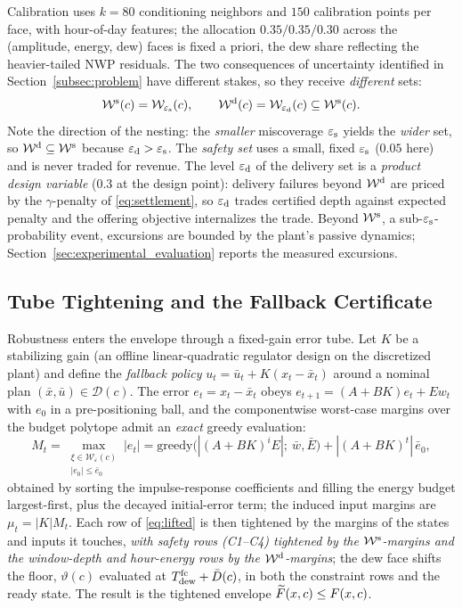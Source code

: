 Calibration uses $k=80$ conditioning neighbors and $150$ calibration points
per face, with hour-of-day features; the allocation $0.35/0.35/0.30$ across
the (amplitude, energy, dew) faces is fixed a priori, the dew share
reflecting the heavier-tailed NWP residuals. The two consequences of
uncertainty identified in Section~\ref{subsec:problem} have different
stakes, so they receive \emph{different} sets:
\begin{equation}
\mathcal{W}^{\mathrm{s}}(c)=\mathcal{W}_{\varepsilon_{\mathrm{s}}}(c),\qquad
\mathcal{W}^{\mathrm{d}}(c)=\mathcal{W}_{\varepsilon_{\mathrm{d}}}(c)\subseteq\mathcal{W}^{\mathrm{s}}(c).
\label{eq:nested}
\end{equation}
Note the direction of the nesting: the \emph{smaller} miscoverage $\varepsilon_{\mathrm{s}}$
yields the \emph{wider} set, so $\mathcal{W}^{\mathrm{d}}\subseteq\mathcal{W}^{\mathrm{s}}$ because
$\varepsilon_{\mathrm{d}}>\varepsilon_{\mathrm{s}}$. The \emph{safety set} uses a small, fixed $\varepsilon_{\mathrm{s}}$ ($0.05$
here) and is never traded for revenue. The level $\varepsilon_{\mathrm{d}}$ of the delivery set is a \emph{product
design variable} ($0.3$ at the design point): delivery failures beyond
$\mathcal{W}^{\mathrm{d}}$ are priced by the $\gamma$-penalty of \eqref{eq:settlement}, so
$\varepsilon_{\mathrm{d}}$ trades certified depth against expected penalty and the offering
objective internalizes the trade. Beyond $\mathcal{W}^{\mathrm{s}}$, a sub-$\varepsilon_{\mathrm{s}}$-probability
event, excursions are bounded by the plant's passive dynamics;
Section~\ref{sec:experimental_evaluation} reports the measured excursions.

\subsection{Tube Tightening and the Fallback Certificate}
\label{subsec:tube}

Robustness enters the envelope through a fixed-gain error tube. Let $K$ be a
stabilizing gain (an offline linear-quadratic regulator design on the
discretized plant) and define
the \emph{fallback policy} $u_t=\bar u_t + K(x_t-\bar x_t)$ around a nominal
plan $(\bar x,\bar u)\in\mathcal{D}(c)$. The error $e_t=x_t-\bar x_t$ obeys
$e_{t+1}=(A+BK)e_t+Ew_t$ with $e_0$ in a pre-positioning ball, and the
componentwise worst-case margins over the budget polytope admit an
\emph{exact} greedy evaluation:
\begin{equation}
M_t=\!\!\max_{\substack{\xi\in\mathcal{W}_\varepsilon(c)\\ |e_0|\le\bar e_0}}\!\!|e_t|
 = \mathrm{greedy}\bigl(|(A{+}BK)^iE|;\ \bar w,\bar E\bigr)
 + |(A{+}BK)^t|\,\bar e_0,
\label{eq:margins}
\end{equation}
obtained by sorting the impulse-response coefficients and filling the energy
budget largest-first, plus the decayed initial-error term; the induced input
margins are $\mu_t=|K|M_t$. Each row of \eqref{eq:lifted} is then tightened
by the margins of the states and inputs it touches, \emph{with safety rows
(C1--C4) tightened by the $\mathcal{W}^{\mathrm{s}}$-margins and the window-depth and
hour-energy rows by the $\mathcal{W}^{\mathrm{d}}$-margins}; the dew face shifts the floor,
$\vartheta(c)$ evaluated at $\Tdew^{\mathrm{fc}}+\bar D(c)$, in both the
constraint rows and the ready state. The result is the tightened envelope
$\widetilde{F}(x,c)\le F(x,c)$.

